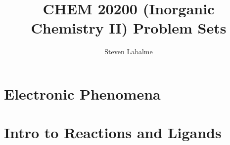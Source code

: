 \documentclass[titlepage]{article}
\title{CHEM 20200 (Inorganic Chemistry II) Problem Sets}
\author{Steven Labalme}
\begin{document}
\maketitle



\tableofcontents
\newpage



\pagestyle{main}
\renewcommand{\leftmark}{Homework \thesection}
\section{Electronic Phenomena}

\newpage



\section{Intro to Reactions and Ligands}

\newpage



\renewcommand{\leftmark}{References}
\printbibliography[heading=bibintoc]
\end{document}
